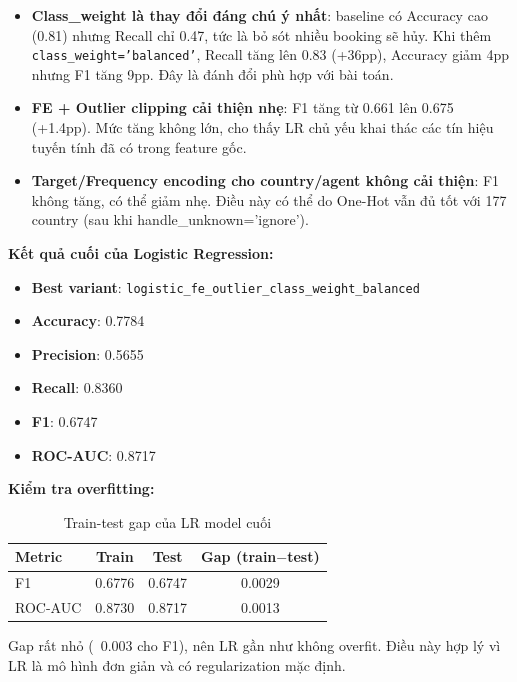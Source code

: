 \documentclass[12pt, a4paper]{article}
\begin{document}
\begin{itemize}
    \item \textbf{Class\_weight là thay đổi đáng chú ý nhất}: baseline có Accuracy cao (0.81) nhưng Recall chỉ 0.47, tức là bỏ sót nhiều booking sẽ hủy. Khi thêm \texttt{class\_weight='balanced'}, Recall tăng lên 0.83 (+36pp), Accuracy giảm 4pp nhưng F1 tăng 9pp. Đây là đánh đổi phù hợp với bài toán.

    \item \textbf{FE + Outlier clipping cải thiện nhẹ}: F1 tăng từ 0.661 lên 0.675 (+1.4pp). Mức tăng không lớn, cho thấy LR chủ yếu khai thác các tín hiệu tuyến tính đã có trong feature gốc.

    \item \textbf{Target/Frequency encoding cho country/agent không cải thiện}: F1 không tăng, có thể giảm nhẹ. Điều này có thể do One-Hot vẫn đủ tốt với 177 country (sau khi handle\_unknown='ignore').
\end{itemize}

\textbf{Kết quả cuối của Logistic Regression:}

\begin{itemize}
    \item \textbf{Best variant}: \texttt{logistic\_fe\_outlier\_class\_weight\_balanced}
    \item \textbf{Accuracy}: 0.7784
    \item \textbf{Precision}: 0.5655
    \item \textbf{Recall}: 0.8360
    \item \textbf{F1}: 0.6747
    \item \textbf{ROC-AUC}: 0.8717
\end{itemize}

\textbf{Kiểm tra overfitting:}

\begin{table}[h!]
\centering
\caption{Train-test gap của LR model cuối}
\begin{tabular}{|l|c|c|c|}
\hline
\textbf{Metric} & \textbf{Train} & \textbf{Test} & \textbf{Gap (train$-$test)} \\ \hline
F1       & 0.6776 & 0.6747 & 0.0029 \\ \hline
ROC-AUC  & 0.8730 & 0.8717 & 0.0013 \\ \hline
\end{tabular}
\end{table}

Gap rất nhỏ (~0.003 cho F1), nên LR gần như không overfit. Điều này hợp lý vì LR là mô hình đơn giản và có regularization mặc định.
\end{document}
